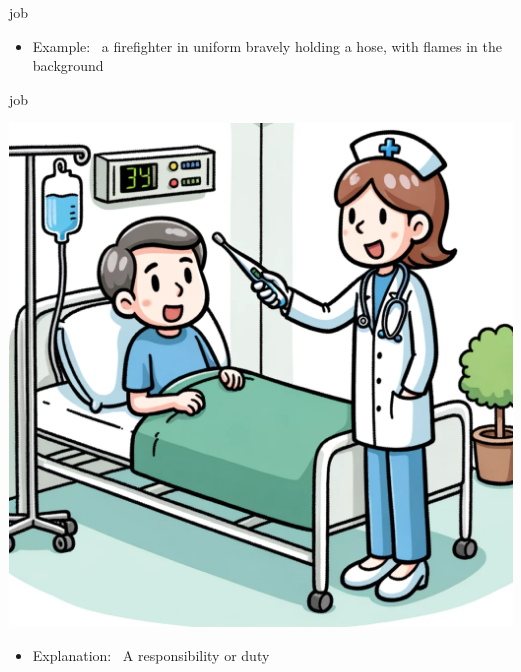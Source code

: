 \documentclass[avery5371, grid,frame]{flashcards}
\begin{document}
\begin{flashcard}{job}
\begin{center}
\begin{minipage}[c]{.45\textwidth}
\begin{itemize}
            \item Example: \ a firefighter in uniform bravely holding a hose, with flames in the background
            \end{itemize}
        \end{minipage}
    \end{center}
    \vspace*{\fill}
\end{flashcard}\begin{flashcard}{job}
    \vspace*{\fill}
    \begin{center}
        \begin{minipage}[c]{.45\textwidth}
            \includegraphics[width=\textwidth]{cards/j/job/job - a nurse checking a patient's temperature in a hospital room.png}
        \end{minipage}
        \begin{minipage}[c]{.45\textwidth}
            \begin{itemize}\setlength\itemsep{12pt}
            \item Explanation: \ A responsibility or duty


\end{itemize}
\end{minipage}
\end{center}
\end{flashcard}
\end{document}
